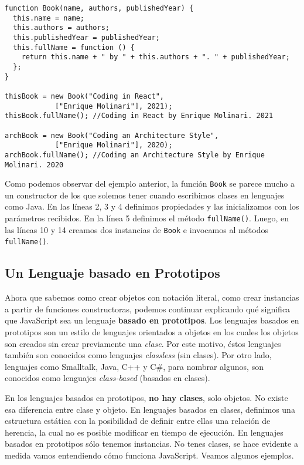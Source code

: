 \documentclass[a4paper, oneside, titlepage, 12pt]{paper}
\begin{document}
\begin{verbatim}
function Book(name, authors, publishedYear) {
  this.name = name;
  this.authors = authors;
  this.publishedYear = publishedYear;
  this.fullName = function () {
    return this.name + " by " + this.authors + ". " + publishedYear;
  };
}

thisBook = new Book("Coding in React", 
			["Enrique Molinari"], 2021);
thisBook.fullName(); //Coding in React by Enrique Molinari. 2021

archBook = new Book("Coding an Architecture Style", 
			["Enrique Molinari"], 2020);
archBook.fullName(); //Coding an Architecture Style by Enrique Molinari. 2020 
\end{verbatim}

Como podemos observar del ejemplo anterior, la función \texttt{Book} se parece mucho a un constructor de los que solemos tener cuando escribimos clases en lenguajes como Java. En las líneas 2, 3 y 4 definimos propiedades y las inicializamos con los parámetros recibidos. En la línea 5 definimos el método \texttt{fullName()}. Luego, en las líneas 10 y 14 creamos dos instancias de \texttt{Book} e invocamos al métodos \texttt{fullName()}. 

\subsection{Un Lenguaje basado en Prototipos}

Ahora que sabemos como crear objetos con notación literal, como crear instancias a partir de funciones constructoras, podemos continuar explicando qué significa que JavaScript sea un lenguaje \textbf{basado en prototipos}. Los lenguajes basados en prototipos son un estilo de lenguajes orientados a objetos en los cuales los objetos son creados sin crear previamente una \textit{clase}. Por este motivo, éstos lenguajes también son conocidos como lenguajes \textit{classless} (sin clases). Por otro lado, lenguajes como Smalltalk, Java, C++ y C\#, para nombrar algunos, son conocidos como lenguajes \textit{class-based} (basados en clases).
\newline

En los lenguajes basados en prototipos, \textbf{no hay clases}, solo objetos. No existe esa diferencia entre clase y objeto. En lenguajes basados en clases, definimos una estructura estática con la posibilidad de definir entre ellas una relación de herencia, la cual no es posible modificar en tiempo de ejecución. En lenguajes basados en prototipos sólo tenemos instancias. No tenes clases, se hace evidente a medida vamos entendiendo cómo funciona JavaScript. Veamos algunos ejemplos.
\newline
\end{document}
